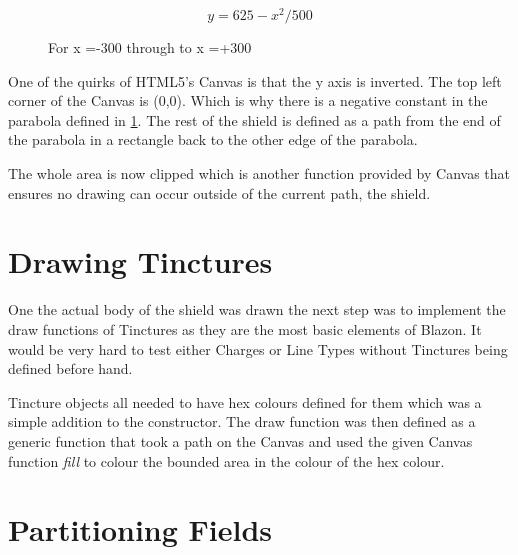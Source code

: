 \begin{figure}[H]
$$ y = 625- x^2/500  $$
\caption{For x =-300 through to x =+300}
\label{math:curve}
\end{figure}


One of the quirks of HTML5's Canvas is that the y axis is inverted.  The top left corner of the Canvas is (0,0).  Which is why there is a negative constant in the parabola defined in \ref{math:curve}.  The rest of the shield is defined as a path from the end of the parabola in a rectangle back to the other edge of the parabola.

The whole area is now clipped which is another function provided by Canvas that ensures no drawing can occur outside of the current path, the shield. 


\section{Drawing Tinctures}
{
	
One the actual body of the shield was drawn the next step was to implement the draw functions of Tinctures as they are the most basic elements of Blazon.  It would be very hard to test either Charges or Line Types without Tinctures being defined before hand.

Tincture objects all needed to have hex colours defined for them which was a simple addition to the constructor.  The draw function was then defined as a generic function that took a path on the Canvas and used the given Canvas function \emph{fill} to colour the bounded area in the colour of the hex colour.  

}

\section{Partitioning Fields}








































